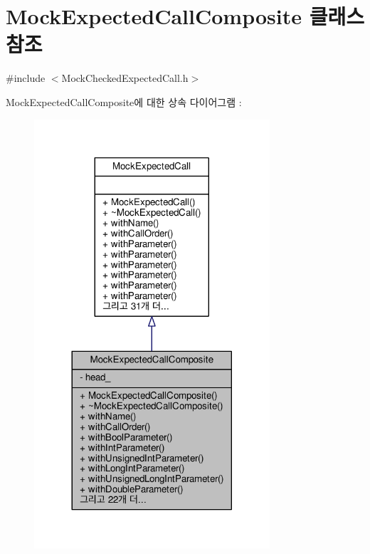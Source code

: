 \hypertarget{class_mock_expected_call_composite}{}\section{Mock\+Expected\+Call\+Composite 클래스 참조}
\label{class_mock_expected_call_composite}


{\ttfamily \#include $<$Mock\+Checked\+Expected\+Call.\+h$>$}



Mock\+Expected\+Call\+Composite에 대한 상속 다이어그램 \+: 
\nopagebreak
\begin{figure}[H]
\begin{center}
\leavevmode
\includegraphics[width=248pt]{class_mock_expected_call_composite__inherit__graph}
\end{center}
\end{figure}


